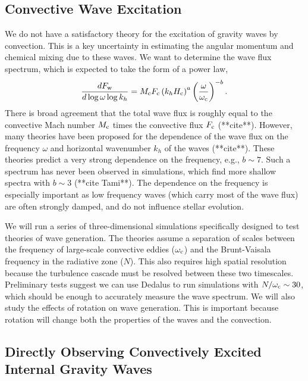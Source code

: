 {\color{purple}
\subsection{Convective Wave Excitation}
}



We do not have a satisfactory theory for the excitation of gravity waves by convection. This is a key uncertainty in estimating the angular momentum and chemical mixing due to these waves. We want to determine the wave flux spectrum, which is expected to take the form of a power law,
\begin{equation}
\frac{d F_{\rm w}}{d\log \omega \log k_h} = M_{\rm c}F_{\rm c} \left(k_h H_{\rm c}\right)^{a} \left(\frac{\omega}{\omega_{\rm c}}\right)^{-b}.
\end{equation}
There is broad agreement that the total wave flux is roughly equal to the convective Mach number $M_{\rm c}$ times the convective flux $F_{\rm c}$ (**cite**). However, many theories have been proposed for the dependence of the wave flux on the frequency $\omega$ and horizontal wavenumber $k_h$ of the waves (**cite**). These theories predict a very strong dependence on the frequency, e.g., $b\sim 7$. Such a spectrum has never been observed in simulations, which find more shallow spectra with $b\sim 3$ (**cite Tami**). The dependence on the frequency is especially important as low frequency waves (which carry most of the wave flux) are often strongly damped, and do not influence stellar evolution. 

We will run a series of three-dimensional simulations specifically designed to test theories of wave generation. The theories assume a separation of scales between the frequency of large-scale convective eddies ($\omega_{\rm c}$) and the Brunt-Vaisala frequency in the radiative zone ($N$). This also requires high spatial resolution because the turbulence cascade must be resolved between these two timescales. Preliminary tests suggest we can use Dedalus to run simulations with $N/\omega_{\rm c}\sim 30$, which should be enough to accurately measure the wave spectrum. We will also study the effects of rotation on wave generation. This is important because rotation will change both the properties of the waves and the convection.

{\color{blue}
\subsection{Directly Observing Convectively Excited Internal Gravity Waves}}

